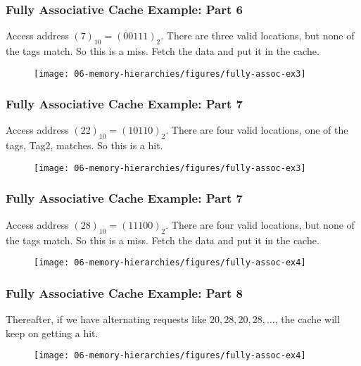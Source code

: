 {\begin{frame}
\end{frame}

\begin{frame}\frametitle{Fully Associative Cache Example: Part 6}
Access address $(7)_{10}=(00111)_2$. There are three valid locations, but none of the tags match. So this is a miss. Fetch the data and put it in the cache.
\begin{figure}[H]
\centering
{\texttt{[image: 06-memory-hierarchies/figures/fully-assoc-ex3]}}
\end{figure}

\end{frame}

\begin{frame}\frametitle{Fully Associative Cache Example: Part 7}
Access address $(22)_{10}=(10110)_2$. There are four valid locations, one of the tags, Tag2, matches. So this is a hit.
\begin{figure}[H]
\centering
{\texttt{[image: 06-memory-hierarchies/figures/fully-assoc-ex3]}}
\end{figure}

\end{frame}

\begin{frame}\frametitle{Fully Associative Cache Example: Part 7}
Access address $(28)_{10}=(11100)_2$. There are four valid locations, but none of the tags match. So this is a miss. Fetch the data and put it in the cache.
\begin{figure}[H]
\centering
{\texttt{[image: 06-memory-hierarchies/figures/fully-assoc-ex4]}}
\end{figure}

\end{frame}
\begin{frame}\frametitle{Fully Associative Cache Example: Part 8}
Thereafter, if we have alternating requests like $20, 28, 20, 28, \dots$, the cache will keep on getting a hit.
\begin{figure}[H]
\centering
{\texttt{[image: 06-memory-hierarchies/figures/fully-assoc-ex4]}}
\end{figure}

\end{frame}
}\fi

